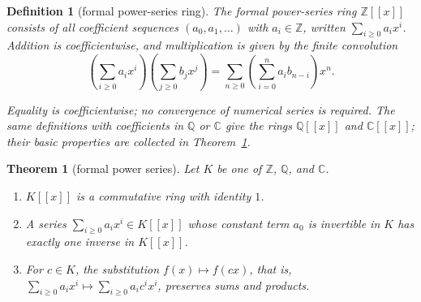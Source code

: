 \documentclass[11pt]{article}
\theoremstyle{ntstyle}
\newtheorem{theorem}{Theorem}[subsection]
\newtheorem{definition}{Definition}[subsection]
\begin{document}
\begin{definition}[formal power-series ring]\label{def:3.5.2} The
	formal power-series ring $\mathbb{Z}[[x]]$ consists of all coefficient
	sequences $(a_0,a_1,\ldots)$ with $a_i\in\mathbb{Z}$, written
	$\sum_{i\ge0}a_ix^i$. Addition is coefficientwise, and multiplication is
	given by the finite convolution
	\[
		\left(\sum_{i\ge0}a_ix^i\right)\left(\sum_{j\ge0}b_jx^j\right)
		=\sum_{n\ge0}\left(\sum_{i=0}^{n}a_i b_{n-i}\right)x^n.
	\]

	Equality is coefficientwise; no convergence of numerical series is required.
	The same definitions with coefficients in $\mathbb{Q}$ or $\mathbb{C}$ give the rings
	$\mathbb{Q}[[x]]$ and $\mathbb{C}[[x]]$; their basic properties are collected in
	Theorem~\ref{thm:3.5.10}.

\end{definition}
\begin{theorem}[formal power series]\label{thm:3.5.10}
	Let $K$ be one of $\mathbb{Z}$, $\mathbb{Q}$, and $\mathbb{C}$.

	\begin{enumerate}[label={\alph*)}]
		\item $K[[x]]$ is a commutative ring with identity $1$.
		\item A series $\sum_{i\ge0}a_ix^i\in K[[x]]$ whose constant term $a_0$ is
		      invertible in $K$ has exactly one inverse in $K[[x]]$.
		\item For $c\in K$, the substitution $f(x)\mapsto f(cx)$, that is,
		      $\sum_{i\ge0}a_ix^i\mapsto\sum_{i\ge0}a_ic^ix^i$, preserves sums and products.
	\end{enumerate}

\end{theorem}
\end{document}
